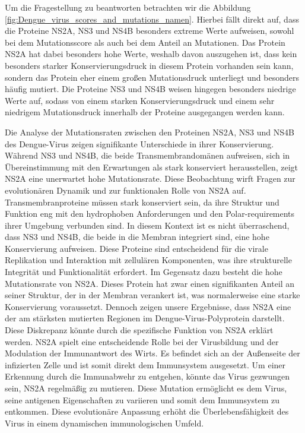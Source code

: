 \documentclass[german,version-2022-01]{uzl-thesis}
\begin{document}
Um die Fragestellung zu beantworten betrachten wir die Abbildung \ref{fig:Dengue_virus_scores_and_mutations_namen}. Hierbei f\"allt direkt auf, dass die Proteine NS2A, NS3 und NS4B besonders extreme Werte aufweisen, sowohl bei dem Mutationsscore als auch bei dem Anteil an Mutationen. Das Protein NS2A hat dabei besonders hohe Werte, weshalb davon auszugehen ist, dass kein besonders starker Konservierungsdruck in diesem Protein vorhanden sein kann, sondern das Protein eher einem gro\ss{}en Mutationsdruck unterliegt und besonders h\"aufig mutiert. Die Proteine NS3 und NS4B weisen hingegen besonders niedrige Werte auf, sodass von einem starken Konservierungsdruck und einem sehr niedrigem Mutationsdruck innerhalb der Proteine ausgegangen werden kann. 

Die Analyse der Mutationsraten zwischen den Proteinen NS2A, NS3 und NS4B des Dengue-Virus zeigen signifikante Unterschiede in ihrer Konservierung. W\"ahrend NS3 und NS4B, die beide Transmembrandom\"anen aufweisen, sich in \"Ubereinstimmung mit den Erwartungen als stark konserviert herausstellen, zeigt NS2A eine unerwartet hohe Mutationsrate. Diese Beobachtung wirft Fragen zur evolution\"aren Dynamik und zur funktionalen Rolle von NS2A auf. Transmembranproteine m\"ussen stark konserviert sein, da ihre Struktur und Funktion eng mit den hydrophoben Anforderungen und den Polar-requirements ihrer Umgebung verbunden sind. In diesem Kontext ist es nicht \"uberraschend, dass NS3 und NS4B, die beide in die Membran integriert sind, eine hohe Konservierung aufweisen. Diese Proteine sind entscheidend f\"ur die virale Replikation und Interaktion mit zellul\"aren Komponenten, was ihre strukturelle Integrit\"at und Funktionalit\"at erfordert. Im Gegensatz dazu besteht die hohe Mutationsrate von NS2A. Dieses Protein hat zwar einen signifikanten Anteil an seiner Struktur, der in der Membran verankert ist, was normalerweise eine starke Konservierung voraussetzt. Dennoch zeigen unsere Ergebnisse, dass NS2A eine der am st\"arksten mutierten Regionen im Dengue-Virus-Polyprotein darstellt. Diese Diskrepanz k\"onnte durch die spezifische Funktion von NS2A erkl\"art werden. NS2A spielt eine entscheidende Rolle bei der Virusbildung und der Modulation der Immunantwort des Wirts. Es befindet sich an der Au\ss{}enseite der infizierten Zelle und ist somit direkt dem Immunsystem ausgesetzt. Um einer Erkennung durch die Immunabwehr zu entgehen, k\"onnte das Virus gezwungen sein, NS2A regelm\"a\ss{}ig zu mutieren. Diese Mutation erm\"oglicht es dem Virus, seine antigenen Eigenschaften zu variieren und somit dem Immunsystem zu entkommen. Diese evolution\"are Anpassung erh\"oht die \"Uberlebensf\"ahigkeit des Virus in einem dynamischen immunologischen Umfeld.
\end{document}
